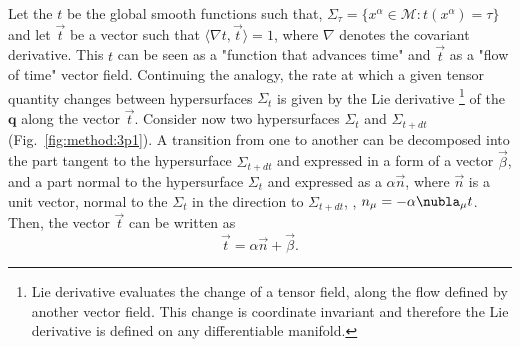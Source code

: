 Let the $t$ be the global smooth functions such that, 
$\Sigma_{\tau} = \{x^{\alpha}\in\mathcal{M}: t(x^{\alpha})=\tau\}$ 
and let $\vec{t}$ be a vector such that $\langle\nabla t, \vec{t}\rangle = 1$,
where $\nabla$ denotes the covariant derivative.
%
This $t$ can be seen as a "function that advances time" and $\vec{t}$ as a "flow of time" vector field. 
Continuing the analogy, the rate at which a given tensor quantity changes 
between hypersurfaces $\Sigma_t$ is given by the Lie derivative
\footnote{
    Lie derivative evaluates the change of a tensor field, along the flow 
    defined by another vector field. This change is coordinate invariant 
    and therefore the Lie derivative is defined on any differentiable manifold.
} of the $\boldsymbol{q}$ along the vector $\vec{t}$.
%
Consider now two hypersurfaces $\Sigma_t$ and $\Sigma_{t+dt}$ (Fig.~\ref{fig:method:3p1}). 
A transition from one to another can be decomposed into the part tangent to the hypersurface 
$\Sigma_{t+dt}$ and expressed in a form of a vector $\vec{\beta}$, and a part normal to the hypersurface 
$\Sigma_t$ and expressed as a $\alpha \vec{n}$, where $\vec{n}$ is a unit vector, 
normal to the $\Sigma_t$ in the direction to $\Sigma_{t+dt}$, \ie, $n_{\mu} = -\alpha \nubla_{\mu}t$.
%
Then, the vector $\vec{t}$ can be written as 
%
\begin{equation*}
\vec{t} = \alpha\vec{n}+\vec{\beta}.
\end{equation*}
%
%
%
